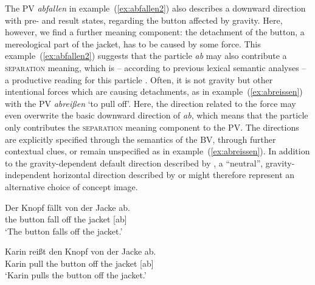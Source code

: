 \documentclass[output=paper]{langsci/langscibook}
\begin{document}
The PV \textit{abfallen} in example~(\ref{ex:abfallen2}) also
describes a downward direction with pre- and result states, regarding
the button affected by gravity. Here, however, we find a further meaning
component: the detachment of the button, a mereological part of the
jacket, has to be caused by some force. This
example~(\ref{ex:abfallen2}) suggests that the particle \textit{ab} may
also contribute a \textsc{separation} meaning, which is -- according to
previous lexical semantic analyses -- a productive reading for this
particle \citep{Kliche:11}. Often, it is not gravity but other
intentional forces which are causing detachments, as in
example~(\ref{ex:abreissen}) with the PV \textit{abreißen} `to pull
off'. Here, the direction related to the force may even overwrite the
basic downward direction of \textit{ab}, which means that the particle
only contributes the \textsc{separation} meaning component to the
PV. The directions are explicitly specified through the semantics of
the BV, through further contextual clues, or remain unspecified as in
example~(\ref{ex:abreissen}). In addition to the gravity-dependent
default direction described by , a ``neutral'',
gravity-independent horizontal direction described by
 or  might therefore represent an
alternative choice of concept image.

\ea\label{ex:abfallen2}
\gll Der Knopf fällt von der Jacke ab.\\
the button fall off the jacket [ab]\\
\glt `The button falls off the jacket.'  
\z

\ea\label{ex:abreissen}
\gll Karin reißt den Knopf von der Jacke ab.\\
Karin pull the button off the jacket [ab]\\
\glt `Karin pulls the button off the jacket.'
\z
\end{document}
